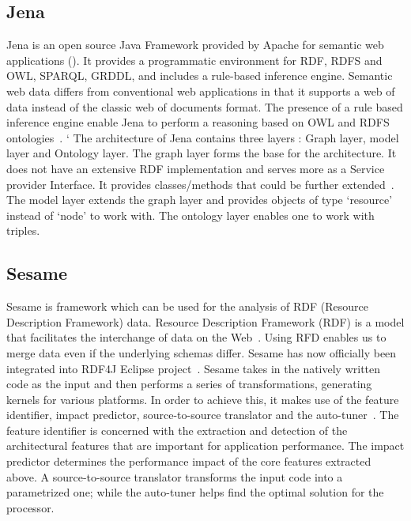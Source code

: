 {     \pv

\subsection{Jena }

Jena is an open source Java Framework provided by Apache for semantic
web applications (\cite{www-w3-jena}). It provides a programmatic
environment for RDF, RDFS and OWL, SPARQL, GRDDL, and includes a
rule-based inference engine. Semantic web data differs from
conventional web applications in that it supports a web of data
instead of the classic web of documents format. The presence of a rule
based inference engine enable Jena to perform a reasoning based on OWL
and RDFS ontologies~\cite{www-trimc-nlp-blogspot}. ` The architecture
of Jena contains three layers : Graph layer, model layer and Ontology
layer. The graph layer forms the base for the architecture. It does
not have an extensive RDF implementation and serves more as a Service
provider Interface. It provides classes/methods that could be further
extended~\cite{www-trimc-nlp-blogspot}.  The model layer extends the
graph layer and provides objects of type ‘resource’ instead of ‘node’
to work with.  The ontology layer enables one to work with triples.

     \pv

\subsection{Sesame}

Sesame is framework which can be used for the analysis of RDF
(Resource Description Framework) data.  Resource Description Framework
(RDF) is a model that facilitates the interchange of data on the
Web~\cite{www-RDF}.  Using RFD enables us to merge data even if the
underlying schemas differ.  Sesame has now officially been integrated
into RDF4J Eclipse project~\cite{www-sesame}.  Sesame takes in the
natively written code as the input and then performs a series of
transformations, generating kernels for various platforms.  In order
to achieve this, it makes use of the feature identifier, impact
predictor, source-to-source translator and the
auto-tuner~\cite{sesame-paper-2013}.  The feature identifier is
concerned with the extraction and detection of the architectural
features that are important for application performance.  The impact
predictor determines the performance impact of the core features
extracted above.  A source-to-source translator transforms the input
code into a parametrized one; while the auto-tuner helps find the
optimal solution for the processor.

}
